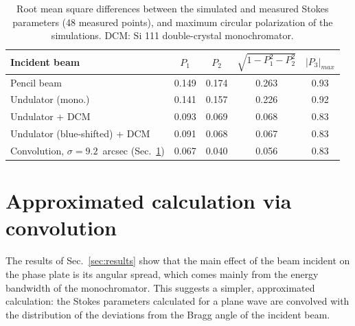 \documentclass{iucr}
\begin{document}
\begin{table}
\caption{Root mean square differences between the simulated and measured Stokes parameters (48 measured points), and maximum circular polarization of the simulations. DCM: Si 111 double-crystal monochromator.}
\label{tab:rms}
\begin{tabular}{lcccc}
\toprule
Incident beam & $P_1$ & $P_2$ & $\sqrt{1-P_1^2-P_2^2}$ & $|P_3|_{max}$ \\
\midrule
Pencil beam        & 0.149 & 0.174 & 0.263 & 0.93 \\
Undulator (mono.)  & 0.141 & 0.157 & 0.226 & 0.92 \\
Undulator + DCM    & 0.093 & 0.069 & 0.068 & 0.83 \\
Undulator (blue-shifted) + DCM & 0.091 & 0.068 & 0.067 & 0.83 \\
Convolution, $\sigma=9.2$~arcsec (Sec.~\ref{sec:convolution}) & 0.067 & 0.040 & 0.056 & 0.83 \\
\bottomrule
\end{tabular}
\end{table}


\section{Approximated calculation via convolution}
\label{sec:convolution}

The results of Sec.~\ref{sec:results} show that the main effect of the beam incident on the phase plate is its angular spread, which comes mainly from the energy bandwidth of the monochromator. This suggests a simpler, approximated calculation: the Stokes parameters calculated for a plane wave are convolved with the distribution of the deviations from the Bragg angle of the incident beam.
\end{document}

